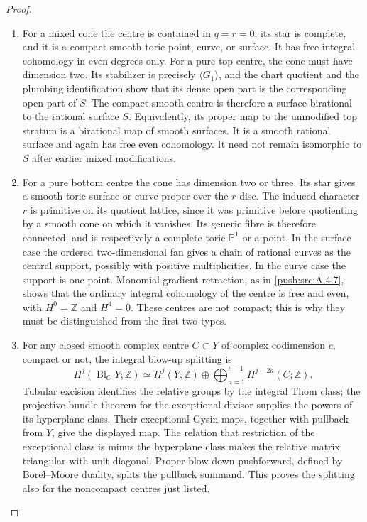 \begin{proof}
\begin{enumerate}[label=\arabic*.,leftmargin=*]
\item For a mixed cone the centre is contained in $q=r=0$;
its star is complete, and it is a compact smooth toric
point, curve, or surface. It has free integral
cohomology in even degrees only. For a pure top centre,
the cone must have dimension two. Its stabilizer is
precisely $\langle G_1\rangle$, and the chart quotient
and the plumbing identification show that its dense
open part is the corresponding open part of $S$.
The compact smooth centre is therefore a surface
birational to the rational surface $S$. Equivalently,
its proper map to the unmodified top stratum is a
birational map of smooth surfaces. It is a smooth
rational surface and again has free even cohomology.
It need not remain isomorphic to $S$ after earlier
mixed modifications.

\item For a pure bottom centre the cone has dimension two
or three. Its star gives a smooth toric surface or
curve proper over the $r$-disc. The induced character
$r$ is primitive on its quotient lattice, since it
was primitive before quotienting by a smooth cone
on which it vanishes. Its generic fibre is therefore
connected, and is respectively a complete toric
$\mathbb P^1$ or a point. In the surface case the
ordered two-dimensional fan gives a chain of rational
curves as the central support, possibly with positive
multiplicities. In the curve case the support is one
point. Monomial gradient retraction, as in \ref{push:src:A.4.7},
shows that the ordinary integral cohomology of the
centre is free and even, with $H^0=\mathbb Z$ and
$H^4=0$. These centres are not compact; this is why
they must be distinguished from the first two types.

\item For any closed smooth complex centre $C\subset Y$ of
complex codimension $c$, compact or not, the integral
blow-up splitting is
\[
 H^j(\operatorname{Bl}_C Y;\mathbb Z)
 \simeq H^j(Y;\mathbb Z)\oplus
       \bigoplus_{a=1}^{c-1}H^{j-2a}(C;\mathbb Z).
\]
Tubular excision identifies the relative
groups by the integral Thom class; the projective-bundle
theorem for the exceptional divisor supplies the powers
of its hyperplane class. Their exceptional Gysin maps,
together with pullback from $Y$, give the displayed
map. The relation that restriction of the exceptional
class is minus the hyperplane class makes the relative
matrix triangular with unit diagonal. Proper
blow-down pushforward, defined by Borel--Moore duality,
splits the pullback summand. This proves the splitting
also for the noncompact centres just listed.


\end{enumerate}
\end{proof}
